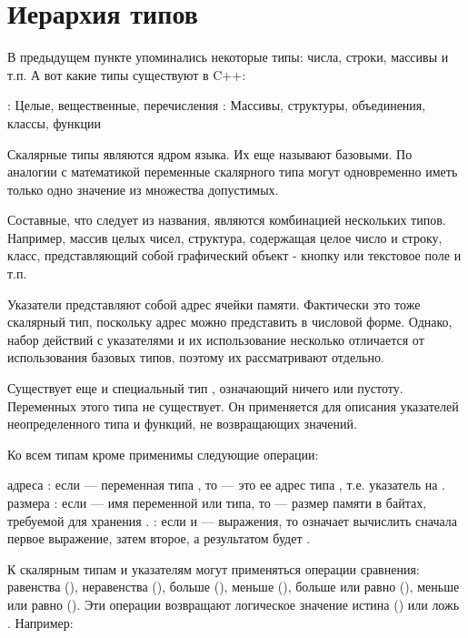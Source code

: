 \documentclass[book.tex]{subfiles}
\begin{document}
\section*{Иерархия типов}

В предыдущем пункте упоминались некоторые типы: числа, строки, массивы и т.п. А вот какие типы существуют в C++:

\begin{itemize}
: Целые, вещественные, перечисления
: Массивы, структуры, объединения, классы, функции
\end{itemize}

Скалярные типы являются ядром языка. Их еще называют базовыми. По аналогии с математикой переменные скалярного типа могут одновременно иметь только одно значение из множества допустимых.

Составные, что следует из названия, являются комбинацией нескольких типов. Например, массив целых чисел, структура, содержащая целое число и строку, класс, представляющий собой графический объект - кнопку или текстовое поле и т.п.

Указатели представляют собой адрес ячейки памяти. Фактически это тоже скалярный тип, поскольку адрес можно представить в числовой форме. Однако, набор действий с указателями и их использование несколько отличается от использования базовых типов, поэтому их рассматривают отдельно.

Существует еще и специальный тип , означающий ничего или пустоту. Переменных этого типа не существует. Он применяется для описания указателей неопределенного типа и функций, не возвращающих значений.

Ко всем типам кроме  применимы следующие операции:

\begin{itemize}
 адреса \cppword{\&}: если  --- переменная типа , то  --- это ее адрес типа , т.е. указатель на .
 размера : если  --- имя переменной или типа, то  --- размер памяти в байтах, требуемой для хранения .
 \cppword{,}: если  и  --- выражения, то  означает вычислить сначала первое выражение, затем второе, а результатом будет .
\end{itemize}

К скалярным типам и указателям могут применяться операции сравнения: равенства (\cppword{==}), неравенства (\cppword{!=}), больше (\cppword{>}), меньше (\cppword{<}), больше или равно (\cppword{>=}), меньше или равно (\cppword{<=}). Эти операции возвращают логическое значение истина () или ложь . Например:
\end{document}
